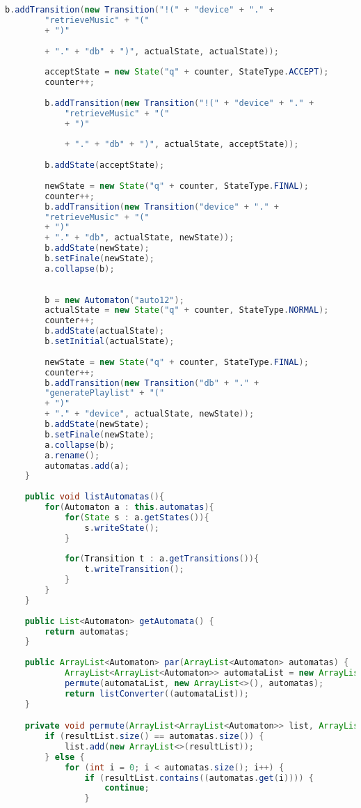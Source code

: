\begin{lstlisting}[language=java, caption={\textit{Specification} osztály.},captionpos=b,label=specification_class]
		b.addTransition(new Transition("!(" + "device" + "." +
		"retrieveMusic" + "("
		+ ")"
		
		+ "." + "db" + ")", actualState, actualState));
		
		acceptState = new State("q" + counter, StateType.ACCEPT);
		counter++;
		
		b.addTransition(new Transition("!(" + "device" + "." +
			"retrieveMusic" + "("
			+ ")"
			
			+ "." + "db" + ")", actualState, acceptState));
		
		b.addState(acceptState);
		
		newState = new State("q" + counter, StateType.FINAL);
		counter++;
		b.addTransition(new Transition("device" + "." +
		"retrieveMusic" + "("
		+ ")"
		+ "." + "db", actualState, newState));
		b.addState(newState);
		b.setFinale(newState);
		a.collapse(b);
		
		
		b = new Automaton("auto12");
		actualState = new State("q" + counter, StateType.NORMAL);
		counter++;
		b.addState(actualState);
		b.setInitial(actualState);
												
		newState = new State("q" + counter, StateType.FINAL);
		counter++;
		b.addTransition(new Transition("db" + "." +
		"generatePlaylist" + "("
		+ ")"
		+ "." + "device", actualState, newState));
		b.addState(newState);
		b.setFinale(newState);
		a.collapse(b);
		a.rename();
		automatas.add(a);
	}
	
	public void listAutomatas(){
		for(Automaton a : this.automatas){
			for(State s : a.getStates()){
				s.writeState();	
			}
			
			for(Transition t : a.getTransitions()){
				t.writeTransition();
			}
		}
	}
	
	public List<Automaton> getAutomata() {
		return automatas;
	}
	
	public ArrayList<Automaton> par(ArrayList<Automaton> automatas) {
	        ArrayList<ArrayList<Automaton>> automataList = new ArrayList<>();
	        permute(automataList, new ArrayList<>(), automatas);
	        return listConverter((automataList));
	}

    private void permute(ArrayList<ArrayList<Automaton>> list, ArrayList<Automaton> resultList, ArrayList<Automaton> automatas) {
        if (resultList.size() == automatas.size()) {
            list.add(new ArrayList<>(resultList));
        } else {
            for (int i = 0; i < automatas.size(); i++) {
                if (resultList.contains((automatas.get(i)))) {
                    continue;
                }


\end{lstlisting}
